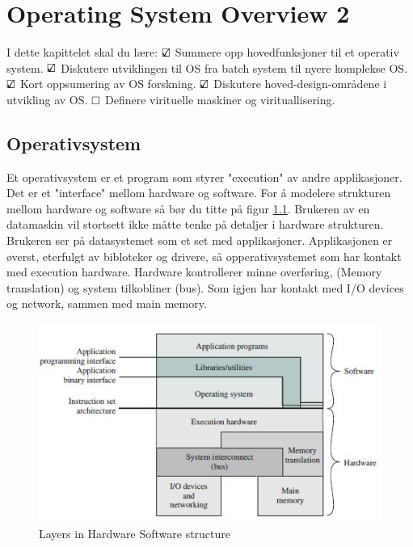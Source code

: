 \chapter{Operating System Overview 2}
I dette kapittelet skal du lære:\newline \newline
$\text{\rlap{$\checkmark$}}\square$
Summere opp hovedfunksjoner til et operativ system. \newline \newline
$\text{\rlap{$\checkmark$}}\square$ 
Diskutere utviklingen til OS fra batch system til nyere komplekse OS. \newline \newline
$\text{\rlap{$\checkmark$}}\square$ 
Kort oppsumering av OS forskning. \newline \newline
$\text{\rlap{$\checkmark$}}\square$ 
Diskutere hoved-design-områdene i utvikling av OS. \newline \newline
$\text{\rlap{}}\square$ 
Definere virituelle maskiner og virituallisering. \newline \newline

\section{Operativsystem}
Et operativsystem er et program som styrer "execution" av andre applikasjoner. Det er et "interface" mellom hardware og software.
\newline \newline
For å modelere strukturen mellom hardware og software så bør du titte på figur \ref{fig:computerHS}. Brukeren av en datamaskin vil stortsett ikke måtte tenke på detaljer i hardware strukturen. Brukeren ser på datasystemet som et set med applikasjoner. Applikasjonen er øverst, eterfulgt av bibloteker og drivere, så opperativsystemet som har kontakt med execution hardware. Hardware kontrollerer minne overføring, (Memory translation) og system tilkobliner (bus). Som igjen har kontakt med I/O devices og network, sammen med main memory.\newline\newline

\begin{figure}[h]
\centering
\includegraphics{img/ComputerHS.JPG}
\caption{Layers in Hardware Software structure}
\label{fig:computerHS}
\end{figure}

